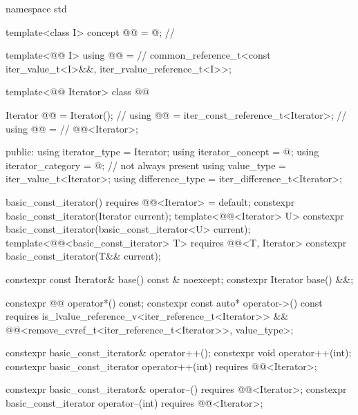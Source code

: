 \begin{codeblock}
namespace std {
  template<class I>
    concept @@ = @\seebelow@;                   // \expos

  template<@@ I>
    using @@ =                       // \expos
      common_reference_t<const iter_value_t<I>&&, iter_rvalue_reference_t<I>>;

  template<@@ Iterator>
  class @@ {
    Iterator @@ = Iterator();                             // \expos
    using @@ = iter_const_reference_t<Iterator>;         // \expos
    using @@ =                                    // \expos
      @@<Iterator>;

  public:
    using iterator_type = Iterator;
    using iterator_concept = @\seebelow@;
    using iterator_category = @\seebelow@;  // not always present
    using value_type = iter_value_t<Iterator>;
    using difference_type = iter_difference_t<Iterator>;

    basic_const_iterator() requires @@<Iterator> = default;
    constexpr basic_const_iterator(Iterator current);
    template<@@<Iterator> U>
      constexpr basic_const_iterator(basic_const_iterator<U> current);
    template<@@<basic_const_iterator> T>
      requires @@<T, Iterator>
      constexpr basic_const_iterator(T&& current);

    constexpr const Iterator& base() const & noexcept;
    constexpr Iterator base() &&;

    constexpr @@ operator*() const;
    constexpr const auto* operator->() const
      requires is_lvalue_reference_v<iter_reference_t<Iterator>> &&
               @@<remove_cvref_t<iter_reference_t<Iterator>>, value_type>;

    constexpr basic_const_iterator& operator++();
    constexpr void operator++(int);
    constexpr basic_const_iterator operator++(int) requires @@<Iterator>;

    constexpr basic_const_iterator& operator--() requires @@<Iterator>;
    constexpr basic_const_iterator operator--(int) requires @@<Iterator>;

}}
\end{codeblock}
